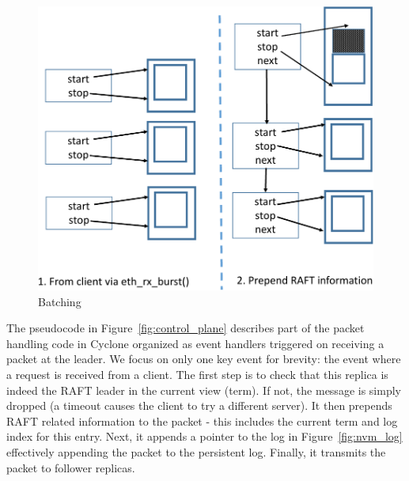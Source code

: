 \documentclass[pageno]{jpaper}
\begin{document}
\begin{figure}
\begin{minipage}{.3\textwidth}
  \includegraphics[scale=0.3]{figures2/batching.pdf}
  \caption{Batching}
  \label{fig:batching}
\end{minipage}
\end{figure}


The pseudocode in Figure~\ref{fig:control_plane} describes part of the packet
handling code in Cyclone organized as event handlers triggered on receiving a
packet at the leader. We focus on only one key event for brevity: the event
where a request is received from a client. The first step is to check that this
replica is indeed the RAFT leader in the current view (term). If not, the
message is simply dropped (a timeout causes the client to try a different
server). It then prepends RAFT related information to the packet - this includes
the current term and log index for this entry. Next, it appends a pointer to the
log in Figure~\ref{fig:nvm_log} effectively appending the packet to the
persistent log. Finally, it transmits the packet to follower replicas.
\end{document}
